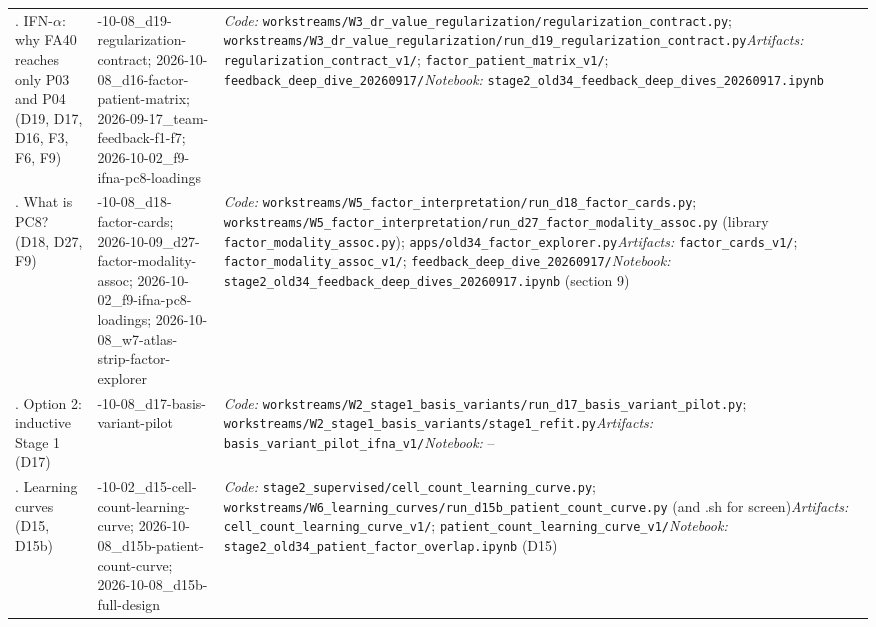 {\begin{longtable}{>{\raggedright\arraybackslash}p{2.6cm} >{\raggedright\arraybackslash}p{4.0cm} >{\raggedright\arraybackslash}p{8.4cm}}
\addlinespace
4. IFN-$\alpha$: why FA40 reaches only P03 and P04 (D19, D17, D16, F3, F6, F9) & 2026-10-08\_d19-regularization-contract; 2026-10-08\_d16-factor-patient-matrix; 2026-09-17\_team-feedback-f1-f7; 2026-10-02\_f9-ifna-pc8-loadings & \emph{Code:} \nolinkurl{workstreams/W3_dr_value_regularization/regularization_contract.py}; \nolinkurl{workstreams/W3_dr_value_regularization/run_d19_regularization_contract.py}\newline \emph{Artifacts:} \nolinkurl{regularization_contract_v1/}; \nolinkurl{factor_patient_matrix_v1/}; \nolinkurl{feedback_deep_dive_20260917/}\newline \emph{Notebook:} \nolinkurl{stage2_old34_feedback_deep_dives_20260917.ipynb} \\
\addlinespace
5. What is PC8? (D18, D27, F9) & 2026-10-08\_d18-factor-cards; 2026-10-09\_d27-factor-modality-assoc; 2026-10-02\_f9-ifna-pc8-loadings; 2026-10-08\_w7-atlas-strip-factor-explorer & \emph{Code:} \nolinkurl{workstreams/W5_factor_interpretation/run_d18_factor_cards.py}; \nolinkurl{workstreams/W5_factor_interpretation/run_d27_factor_modality_assoc.py} (library \nolinkurl{factor_modality_assoc.py}); \nolinkurl{apps/old34_factor_explorer.py}\newline \emph{Artifacts:} \nolinkurl{factor_cards_v1/}; \nolinkurl{factor_modality_assoc_v1/}; \nolinkurl{feedback_deep_dive_20260917/}\newline \emph{Notebook:} \nolinkurl{stage2_old34_feedback_deep_dives_20260917.ipynb} (section 9) \\
\addlinespace
6. Option 2: inductive Stage 1 (D17) & 2026-10-08\_d17-basis-variant-pilot & \emph{Code:} \nolinkurl{workstreams/W2_stage1_basis_variants/run_d17_basis_variant_pilot.py}; \nolinkurl{workstreams/W2_stage1_basis_variants/stage1_refit.py}\newline \emph{Artifacts:} \nolinkurl{basis_variant_pilot_ifna_v1/}\newline \emph{Notebook:} -- \\
\addlinespace
7. Learning curves (D15, D15b) & 2026-10-02\_d15-cell-count-learning-curve; 2026-10-08\_d15b-patient-count-curve; 2026-10-08\_d15b-full-design & \emph{Code:} \nolinkurl{stage2_supervised/cell_count_learning_curve.py}; \nolinkurl{workstreams/W6_learning_curves/run_d15b_patient_count_curve.py} (and .sh for screen)\newline \emph{Artifacts:} \nolinkurl{cell_count_learning_curve_v1/}; \nolinkurl{patient_count_learning_curve_v1/}\newline \emph{Notebook:} \nolinkurl{stage2_old34_patient_factor_overlap.ipynb} (D15) \\

\end{longtable}}
